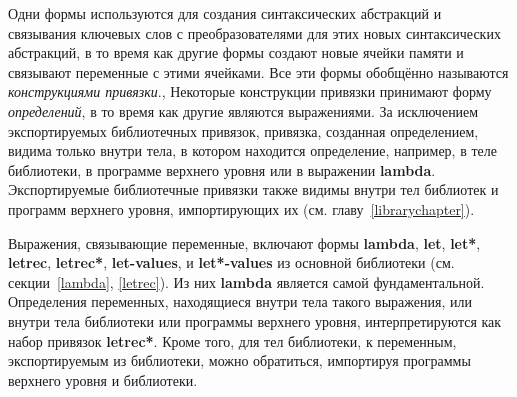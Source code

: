 Одни формы используются для создания синтаксических абстракций и связывания ключевых
слов с преобразователями для этих новых синтаксических абстракций, в то время как другие формы
создают новые ячейки памяти и связывают переменные с этими ячейками. Все эти
формы обобщённо называются {\em конструкциями привязки}., Некоторые
конструкции привязки принимают форму \textit{определений}, в то время как
другие являются выражениями. За исключением экспортируемых библиотечных привязок, привязка,
созданная определением, видима только внутри тела, в котором находится определение,
например, в теле библиотеки, в программе верхнего уровня или в выражении {\cf\bfseries
  lambda}. Экспортируемые библиотечные привязки также видимы внутри тел библиотек и программ
верхнего уровня, импортирующих их (см. главу~\ref{librarychapter}).

Выражения, связывающие переменные, включают формы {\cf\bfseries lambda}, {\cf\bfseries let},
{\cf\bfseries let*}, {\cf\bfseries letrec}, {\cf\bfseries letrec*}, {\cf\bfseries let-values}, и
{\cf\bfseries let*-values} из основной библиотеки (см. секции~\ref{lambda}, \ref {letrec}). Из
них {\cf\bfseries lambda} является самой фундаментальной. Определения переменных, находящиеся внутри
тела такого выражения, или внутри тела библиотеки или программы верхнего уровня,
интерпретируются как набор привязок {\cf\bfseries letrec*}. Кроме того, для тел библиотеки, к переменным,
экспортируемым из библиотеки, можно обратиться, импортируя программы верхнего уровня и
библиотеки.

